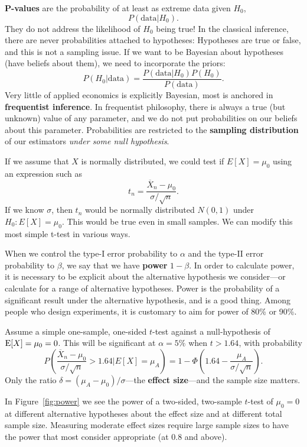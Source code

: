 \documentclass[twoside]{article}
\begin{document}
\textbf{P-values} are the probability of at least as extreme data given $H_0$,
\[ P( \text{data}| H_0).\]
They do not address the likelihood of $H_0$ being true!
In the classical inference, there are never probabilities attached to hypotheses: Hypotheses are true 
or false, and this is not a sampling issue.
If we want to be Bayesian about hypotheses (have beliefs about them), we need to incorporate the priors: 
\[ P(H_0|\text{data}) = \frac{ P(\text{data}|H_0) P(H_0)}{ P(\text{data}) }. \]
Very little of applied economics is explicitly Bayesian, most is anchored in
\textbf{frequentist inference}. In frequentist philosophy, there is always a
true (but unknown) value of any parameter, and we do not put probabilities on
our beliefs about this parameter. Probabilities are restricted to the
\textbf{sampling distribution} of our estimators \emph{under some null
hypothesis}.

If we assume that $X$ is normally distributed, we could 
test if $E[X] = \mu_0$ using an expression such as
\[
t_n = \frac{\overline{X}_n - \mu_0}{\sigma/\sqrt{n}}.
\]
If we know $\sigma$, then $t_n$ would be normally distributed $N(0,1)$ under $H_0: E[X]=\mu_0$. 
This would be true even in small samples.
We can modify this most simple t-test in various ways.


When we control the type-I error probability to $\alpha$ and the type-II error probability
to $\beta$, we say that we have \textbf{power} $1-\beta$. 
In order to calculate power, it is necessary to be explicit about the alternative hypothesis 
we consider---or calculate for a range of alternative hypotheses. 
Power is the probability of a significant result under the alternative hypothesis, and is a good thing. 
Among people who design experiments, it is customary to aim for power of 80\% or 90\%.

Assume a simple one-sample, one-sided $t$-test against a null-hypothesis of $\operatorname{E}[X]=\mu_0=0$. This will
be significant at $\alpha=5\%$ when $t> 1.64$, with probability
\[
P\left( \frac{\overline{X}_n - \mu_0}{\sigma/\sqrt{n}} > 1.64 | E[X]=\mu_A\right) = 
1 - \Phi\left( 1.64 - \frac{\mu_A}{\sigma/\sqrt{n}}\right).
\]
Only the ratio $\delta=(\mu_A-\mu_0)/\sigma$---the \textbf{effect size}---and the sample
size matters.

In Figure~\ref{fig:power} we see the power of a two-sided, two-sample $t$-test
of $\mu_0=0$ at different alternative hypotheses about the effect size and at
different total sample size. Measuring moderate effect sizes require large sample
sizes to have the power that most consider appropriate (at 0.8 and above). 
\end{document}
